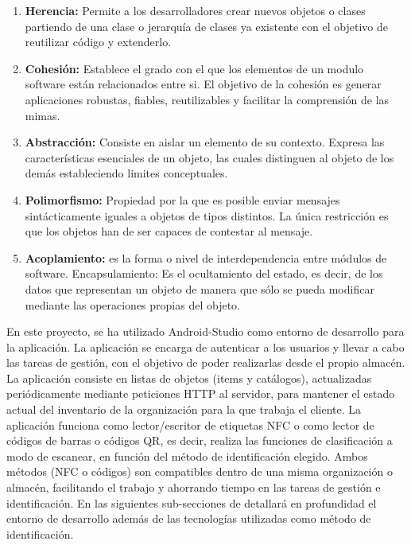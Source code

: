 \documentclass[a4paper,11pt]{book}
\begin{document}
\begin{enumerate}
\item \textbf{Herencia:} Permite a los desarrolladores crear nuevos objetos o clases partiendo de una clase o jerarquía de clases ya existente con el objetivo de reutilizar código y extenderlo. 
\item \textbf{Cohesión:} Establece el grado con el que los elementos de un modulo software están relacionados entre si. El objetivo de la cohesión es generar aplicaciones robustas, fiables, reutilizables y facilitar la comprensión de las mimas.
\item \textbf{Abstracción:} Consiste en aislar un elemento de su contexto. Expresa las características esenciales de un objeto, las cuales distinguen al objeto de los demás estableciendo limites conceptuales.
\item \textbf{Polimorfismo:} Propiedad por la que es posible enviar mensajes sintácticamente iguales a objetos de tipos distintos. La única restricción es que los objetos han de ser capaces de contestar al mensaje. 
\item \textbf{Acoplamiento:} es la forma o nivel de interdependencia entre módulos de software. 
 Encapsulamiento: Es el ocultamiento del estado, es decir, de los datos que representan un objeto de manera que sólo se pueda modificar mediante las operaciones propias del objeto.
\end{enumerate}

En este proyecto, se ha utilizado Android-Studio como entorno de desarrollo para la aplicación. La aplicación se encarga de autenticar a los usuarios y llevar a cabo las tareas de gestión, con el objetivo de poder realizarlas desde el propio almacén. La aplicación consiste en listas de  objetos (items y catálogos), actualizadas periódicamente mediante peticiones HTTP al servidor, para mantener el estado actual del inventario de la organización para la que trabaja el cliente. La aplicación funciona como lector/escritor de etiquetas NFC o como lector de códigos de barras o códigos QR, es decir, realiza las funciones de clasificación a modo de escanear, en función del método de identificación elegido. Ambos métodos (NFC o códigos) son compatibles dentro de una misma organización o almacén, facilitando el trabajo y ahorrando tiempo en las tareas de gestión e identificación. En las siguientes sub-secciones de detallará en profundidad el entorno de desarrollo además de las tecnologías utilizadas como método de identificación. 
 
  
\end{document}
